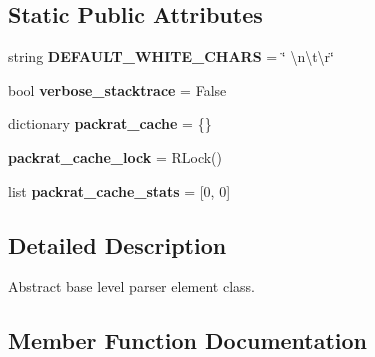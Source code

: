 \subsection*{Static Public Attributes}
\begin{DoxyCompactItemize}
\item 
\mbox{\label{classpkg__resources_1_1__vendor_1_1pyparsing_1_1_parser_element_a023a8d15793072d0dc7eca8cb50b1844}} 
string {\bfseries D\+E\+F\+A\+U\+L\+T\+\_\+\+W\+H\+I\+T\+E\+\_\+\+C\+H\+A\+RS} = \char`\"{} \textbackslash{}n\textbackslash{}t\textbackslash{}r\char`\"{}
\item 
\mbox{\label{classpkg__resources_1_1__vendor_1_1pyparsing_1_1_parser_element_a30a858072fd1e5119992f23c2d54c180}} 
bool {\bfseries verbose\+\_\+stacktrace} = False
\item 
\mbox{\label{classpkg__resources_1_1__vendor_1_1pyparsing_1_1_parser_element_ab79606770baa97fd606984cedd613fda}} 
dictionary {\bfseries packrat\+\_\+cache} = \{\}
\item 
\mbox{\label{classpkg__resources_1_1__vendor_1_1pyparsing_1_1_parser_element_aaa7bc85eb703498dff5b2d08092ef021}} 
{\bfseries packrat\+\_\+cache\+\_\+lock} = R\+Lock()
\item 
\mbox{\label{classpkg__resources_1_1__vendor_1_1pyparsing_1_1_parser_element_a9b50f0811cb8cb8f32d375161c468afd}} 
list {\bfseries packrat\+\_\+cache\+\_\+stats} = \mbox{[}0, 0\mbox{]}
\end{DoxyCompactItemize}


\subsection{Detailed Description}
\begin{DoxyVerb}Abstract base level parser element class.\end{DoxyVerb}
 

\subsection{Member Function Documentation}
\mbox{\label{classpkg__resources_1_1__vendor_1_1pyparsing_1_1_parser_element_afa021ee7188faf2cffd826344563b6bf}} 
